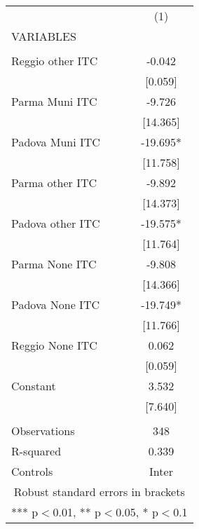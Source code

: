 \begin{tabular}{lc} \hline
 & (1) \\
VARIABLES &  \\ \hline
 &  \\
Reggio other ITC & -0.042 \\
 & [0.059] \\
Parma Muni ITC & -9.726 \\
 & [14.365] \\
Padova Muni ITC & -19.695* \\
 & [11.758] \\
Parma other ITC & -9.892 \\
 & [14.373] \\
Padova other ITC & -19.575* \\
 & [11.764] \\
Parma None ITC & -9.808 \\
 & [14.366] \\
Padova None ITC & -19.749* \\
 & [11.766] \\
Reggio None ITC & 0.062 \\
 & [0.059] \\
Constant & 3.532 \\
 & [7.640] \\
 &  \\
Observations & 348 \\
R-squared & 0.339 \\
 Controls & Inter \\ \hline
\multicolumn{2}{c}{ Robust standard errors in brackets} \\
\multicolumn{2}{c}{ *** p$<$0.01, ** p$<$0.05, * p$<$0.1} \\
\end{tabular}
